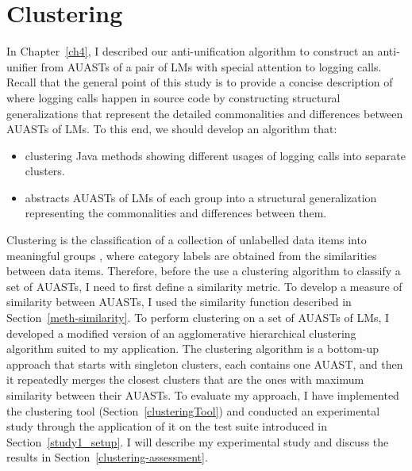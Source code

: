 \chapter{Clustering}  \label{clustering}
In Chapter~\ref{ch4}, I described our anti-unification algorithm to construct an anti-unifier from AUASTs of a pair of LMs with special attention to logging calls. Recall that the general point of this study is to provide a concise description of where logging calls happen in source code by constructing structural generalizations that represent the detailed commonalities and differences between AUASTs of LMs. To this end, we should develop an algorithm that:
\begin{itemize} [leftmargin=.5in]
\item clustering Java methods showing different usages of logging calls into separate clusters.

\item abstracts AUASTs of LMs of each group into a structural generalization representing the commonalities and differences between them.
\end{itemize}

Clustering is the classification of a collection of unlabelled data items into meaningful groups \cite{jain1999data}, where category labels are obtained from the similarities between data items. Therefore, before the use a clustering algorithm to classify a set of AUASTs, I need to first define a similarity metric. To develop a measure of similarity between AUASTs, I used the similarity function described in Section~\ref{meth-similarity}. To perform clustering on a set of AUASTs of LMs, I developed a modified version of an agglomerative hierarchical clustering algorithm suited to my application. The clustering algorithm is a bottom-up approach that starts with singleton clusters, each contains one AUAST, and then it repeatedly merges the closest clusters that are the ones with maximum similarity between their AUASTs. To evaluate my approach, I have implemented the clustering tool (Section~\ref{clusteringTool}) and conducted an experimental study through the application of it on the test suite introduced in Section~\ref{study1_setup}. I will describe my experimental study and discuss the results in Section~\ref{clustering-assessment}.



